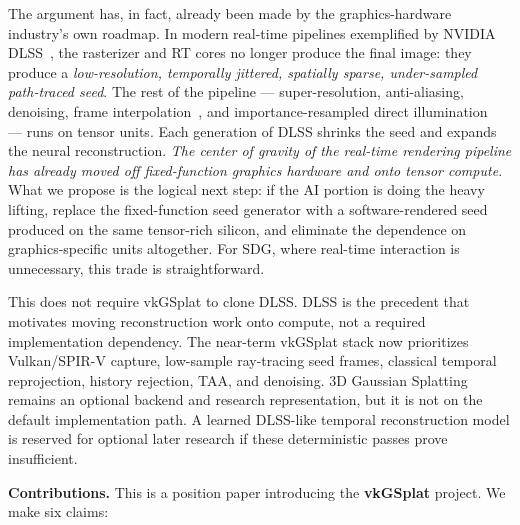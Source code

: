 \documentclass[10pt,journal]{IEEEtran}
\begin{document}
The argument has, in fact, already been made by the
graphics-hardware industry's own roadmap. In modern real-time pipelines
exemplified by NVIDIA DLSS~\cite{nvidia-dlss,liu2020nsrr,nvidia-dlss3},
the rasterizer and RT cores no longer produce the final image: they
produce a \emph{low-resolution, temporally jittered, spatially sparse,
under-sampled path-traced seed}. The rest of the pipeline ---
super-resolution, anti-aliasing, denoising, frame
interpolation~\cite{schied2017svgf,chaitanya2017interactive,nvidia-nrd},
and importance-resampled direct illumination~\cite{bitterli2020restir} ---
runs on tensor units. Each generation of DLSS shrinks the seed and
expands the neural reconstruction. \emph{The center of gravity of the
real-time rendering pipeline has already moved off fixed-function
graphics hardware and onto tensor compute.} What we propose is the
logical next step: if the AI portion is doing the heavy lifting, replace
the fixed-function seed generator with a software-rendered seed produced
on the same tensor-rich silicon, and eliminate the dependence on
graphics-specific units altogether. For SDG, where real-time interaction
is unnecessary, this trade is straightforward.

This does not require vkGSplat to clone DLSS. DLSS is the precedent that
motivates moving reconstruction work onto compute, not a required
implementation dependency. The near-term vkGSplat stack now prioritizes
Vulkan/SPIR-V capture, low-sample ray-tracing seed frames, classical
temporal reprojection, history rejection, TAA, and denoising. 3D
Gaussian Splatting remains an optional backend and research
representation, but it is not on the default implementation path. A
learned DLSS-like temporal reconstruction model is reserved for optional
later research if these deterministic passes prove insufficient.

\textbf{Contributions.} This is a position paper introducing the
\textbf{vkGSplat} project. We make six claims:
\end{document}
